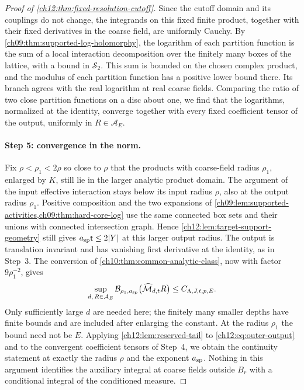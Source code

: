 \begin{proof}[Proof of \cref{ch12:thm:fixed-resolution-cutoff}]
Since the cutoff domain and its couplings do not change, the integrands on this fixed finite product, together with their fixed derivatives in the coarse field, are uniformly Cauchy. By \cref{ch09:thm:supported-log-holomorphy}, the logarithm of each partition function is the sum of a local interaction decomposition over the finitely many boxes of the lattice, with a bound in $\mathscr S_2$. This sum is bounded on the chosen complex product, and the modulus of each partition function has a positive lower bound there. Its branch agrees with the real logarithm at real coarse fields. Comparing the ratio of two close partition functions on a disc about one, we find that the logarithms, normalized at the identity, converge together with every fixed coefficient tensor of the output, uniformly in $R\in\mathcal A_E$.

\paragraph{Step 5: convergence in the norm.}
Fix $\rho<\rho_1<2\rho$ so close to $\rho$ that the products with coarse-field radius $\rho_1$, enlarged by $K$, still lie in the larger analytic product domain. The argument of the input effective interaction stays below its input radius $\rho$, also at the output radius $\rho_1$. Positive composition and the two expansions of \cref{ch09:lem:supported-activities,ch09:thm:hard-core-log} use the same connected box sets and their unions with connected intersection graph. Hence \cref{ch12:lem:target-support-geometry} still gives $a_{\mathrm{sp}}\mathsf t\le2\lvert Y\rvert$ at this larger output radius. The output is translation invariant and has vanishing first derivative at the identity, as in Step~3. The conversion of \cref{ch10:thm:common-analytic-class}, now with factor $9\rho_1^{-2}$, gives
\begin{equation}
 \sup_{d,\,R\in\mathcal A_E}\mathcal B_{\rho_1,a_{\mathrm{sp}}}\bigl(\widehat{\mathcal M}_{d,t}R\bigr)\le C_{\Lambda,J,t,p,E}. \label{ch12:eq:outer-output}
\end{equation}
Only sufficiently large $d$ are needed here; the finitely many smaller depths have finite bounds and are included after enlarging the constant. At the radius $\rho_1$ the bound need not be $E$. Applying \cref{ch12:lem:reserved-tail} to \eqref{ch12:eq:outer-output} and to the convergent coefficient tensors of Step~4, we obtain the continuity statement at exactly the radius $\rho$ and the exponent $a_{\mathrm{sp}}$. Nothing in this argument identifies the auxiliary integral at coarse fields outside $B_r$ with a conditional integral of the conditioned measure.


\end{proof}
